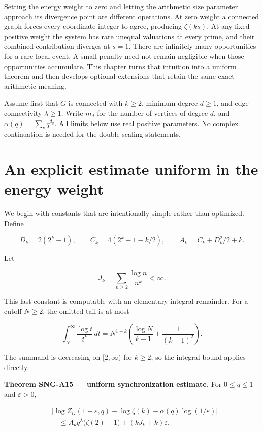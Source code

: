 \documentclass[
  11pt,
  a4paper,
]{report}
\begin{document}
Setting the energy weight to zero and letting the arithmetic size
parameter approach its divergence point are different operations. At
zero weight a connected graph forces every coordinate integer to agree,
producing \(\zeta(ks)\). At any fixed positive weight the system has
rare unequal valuations at every prime, and their combined contribution
diverges at \(s=1\). There are infinitely many opportunities for a rare
local event. A small penalty need not remain negligible when those
opportunities accumulate. This chapter turns that intuition into a
uniform theorem and then develops optional extensions that retain the
same exact arithmetic meaning.

Assume first that \(G\) is connected with \(k\ge2\), minimum degree
\(d\ge1\), and edge connectivity \(\lambda\ge1\). Write \(m_d\) for the
number of vertices of degree \(d\), and \(\alpha(q)=\sum_vq^{d_v}\). All
limits below use real positive parameters. No complex continuation is
needed for the double-scaling statements.

\hypertarget{an-explicit-estimate-uniform-in-the-energy-weight}{%
\section{An explicit estimate uniform in the energy
weight}\label{an-explicit-estimate-uniform-in-the-energy-weight}}

We begin with constants that are intentionally simple rather than
optimized. Define

\[
 D_k=2(2^k-1),\qquad
 C_k=4(2^k-1-k/2),\qquad
 A_k=C_k+D_k^2/2+k.
 \tag{8.1}
\]

Let

\[
 J_k=\sum_{n\ge2}\frac{\log n}{n^k}<\infty.
\]

This last constant is computable with an elementary integral remainder.
For a cutoff \(N\ge2\), the omitted tail is at most

\[
 \int_N^\infty\frac{\log t}{t^k}\,dt
 =N^{1-k}\left(\frac{\log N}{k-1}+\frac1{(k-1)^2}\right).
 \tag{8.2}
\]

The summand is decreasing on \([2,\infty)\) for \(k\ge2\), so the
integral bound applies directly.

\textbf{Theorem SNG-A15 --- uniform synchronization estimate.} For
\(0\le q\le1\) and \(\varepsilon>0\),

\[
 \begin{aligned}
 &\left|\log Z_G(1+\varepsilon,q)
 -\log\zeta(k)-\alpha(q)\log(1/\varepsilon)\right|\\
 &\quad\le
 A_kq^\lambda\bigl(\zeta(2)-1\bigr)
 +(kJ_k+k)\varepsilon.
 \end{aligned}
 \tag{8.3}
\]
\end{document}

